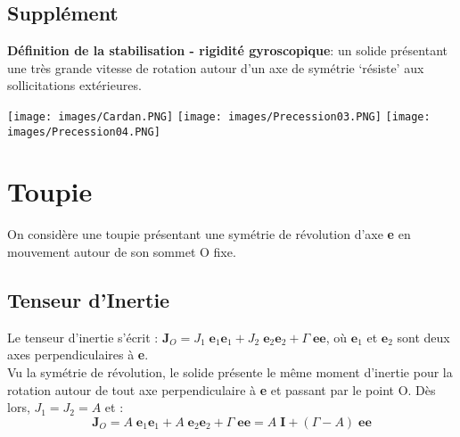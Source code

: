 \documentclass[a4paper]{article}
\begin{document}
\subsection{Supplément}





\textbf{Définition de la stabilisation - rigidité gyroscopique}: un solide présentant une très grande vitesse de rotation autour d’un axe de symétrie ‘résiste’ aux sollicitations extérieures.

\begin{center}
\texttt{[image: images/Cardan.PNG]}
\texttt{[image: images/Precession03.PNG]}
\texttt{[image: images/Precession04.PNG]}
\end{center}









\section{Toupie}





On considère une toupie présentant une symétrie de révolution d’axe \textbf{e} en mouvement autour de son sommet O fixe.





\subsection{Tenseur d'Inertie}





Le tenseur d'inertie s'écrit : $ \textbf{J}_O = J_1 \; \textbf{e}_1 \textbf{e}_1 + J_2 \; \textbf{e}_2 \textbf{e}_2 + \Gamma \; \textbf{e} \textbf{e} $, où $ \textbf{e}_1 $ et $ \textbf{e}_2 $ sont deux axes perpendiculaires à \textbf{e}. \\
Vu la symétrie de révolution, le solide présente le même moment d’inertie pour la rotation autour de tout axe perpendiculaire à \textbf{e} et passant par le point O. Dès lors, $ J_1 = J_2 = A $ et : 
\[ \textbf{J}_O = A \; \textbf{e}_1 \textbf{e}_1 + A \; \textbf{e}_2 \textbf{e}_2 + \Gamma \; \textbf{e} \textbf{e} = A \; \textbf{I} + (\Gamma - A) \; \textbf{e} \textbf{e} \]
\end{document}
